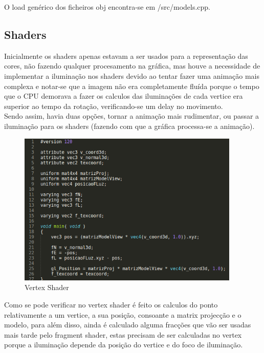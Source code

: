 \documentclass[11pt,a4paper]{report}
\begin{document}
O load genérico dos ficheiros obj encontra-se em /src/models.cpp.

\subsection{Shaders}

Inicialmente os shaders apenas estavam a ser usados para a representação das cores, não fazendo qualquer procesamento na gráfica, mas houve a necessidade de implementar a iluminação nos shaders devido ao tentar fazer uma animação mais complexa e notar-se que a imagem não era completamente fluída porque o tempo que o CPU demorava a fazer os calculos das iluminações de cada vertice era superior ao tempo da rotação, verificando-se um delay no movimento.\\

Sendo assim, havia duas opções, tornar a animação mais rudimentar, ou passar a iluminação para os shaders (fazendo com que a gráfica processa-se a animação).

\begin{figure}[H]
\centerline{\includegraphics[width=300pt]{images/vertexshader.png}}
\caption{Vertex Shader}
\label{img:complete}
\end{figure}

Como se pode verificar no vertex shader é feito os calculos do ponto relativamente a um vertice, a sua posição, consoante a matrix projecção e o modelo, para além disso, ainda é calculado alguma fracções que vão ser usadas mais tarde pelo fragment shader, estas precisam de ser calculadas no vertex porque a iluminação depende da posição do vertice e do foco de iluminação.
\end{document}
